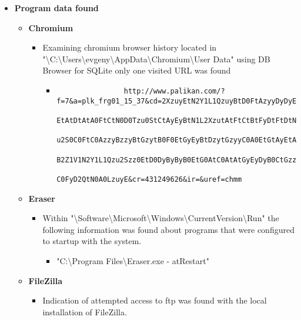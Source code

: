 \begin{enumerate}
\begin{itemize}
	\item \textbf{Program data found}
	\begin{itemize}
		\item \textbf{Chromium}
		\begin{itemize}
			\item Examining chromium browser history located in "\textbackslash C:\textbackslash Users\textbackslash evgeny\textbackslash AppData\textbackslash Chromium\textbackslash User Data" using DB Browser for SQLite only one visited URL was found
			\begin{itemize}
				\item \begin{verbatim}
				http://www.palikan.com/?f=7&a=plk_frg01_15_37&cd=2XzuyEtN2Y1L1QzuyBtD0FtAzyyDyDyEzyy
				EtAtDtAtA0FtCtN0D0Tzu0StCtAyEyBtN1L2XzutAtFtCtBtFyDtFtDtN1L1Czu1StN1L1G1B1V1N2Y1L1Qz
				u2S0C0FtC0AzzyBzzyBtGzytB0F0EtGyEyBtDzytGzyyC0A0EtGtAyEtAtC0AtC0EtC0ByDyBzz2QtN1M1F1
				B2Z1V1N2Y1L1Qzu2Szz0EtD0DyByByB0EtG0AtC0AtAtGyEyDyB0CtGzztAtA0FtGtBtD0Czz0BzztC0CyEt
				C0FyD2QtN0A0LzuyE&cr=431249626&ir=&uref=chmm
				\end{verbatim}
			\end{itemize}
		\end{itemize}
		
		\item \textbf{Eraser}
		\begin{itemize}
			\item Within "\textbackslash Software\textbackslash Microsoft\textbackslash Windows\textbackslash CurrentVersion\textbackslash Run" the following information was found about programs that were configured to startup with the system.
			\begin{itemize}
				\item "C:\textbackslash Program Files\textbackslash Eraser.exe - atRestart"
			\end{itemize}
		\end{itemize}
		
		
		\item \textbf{FileZilla}
		\begin{itemize}
			
			\item Indication of attempted access to ftp was found with the local installation of FileZilla.
			

\end{itemize}
\end{itemize}
\end{itemize}
\end{enumerate}
